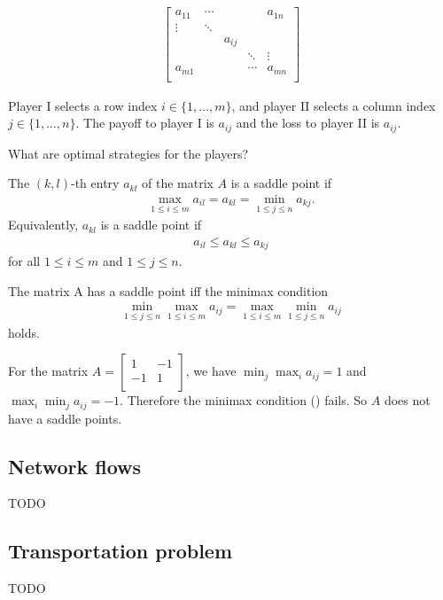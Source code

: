 \begin{align}
    \begin{bmatrix}
        a_{11} & \cdots &        &        & a_{1n} \\
        \vdots & \ddots &        &        & \\
               &        & a_{ij} &        & \\
               &        &        & \ddots & \vdots \\
        a_{m1} &        &        & \cdots & a_{mn} \\
    \end{bmatrix}
\end{align}

Player I selects a row index $i \in \{ 1, \dots, m \}$, and player II selects a column index $j \in \{ 1, \dots, n \}$.
The payoff to player I is $a_{ij}$ and the loss to player II is $a_{ij}$.

What are optimal strategies for the players?

\begin{definition}
The $(k,l)$-th entry $a_{kl}$ of the matrix $A$ is a saddle point if 
\begin{align}
    \max _{1 \le i \le m} a_{il} = a_{kl} = \min _{1 \le j \le n} a_{kj}.
\end{align}
Equivalently, $a_{kl}$ is a saddle point if 
\begin{align}
    a_{il} \le a_{kl} \le a_{kj}
\end{align}
for all $1 \le i \le m$ and $1 \le j \le n$.
\end{definition}

\begin{theorem}
    The matrix A has a saddle point iff the minimax condition
    \begin{align}
        \min _{1 \le j \le n} \max _{1 \le i \le m} a_{ij} = \max _{1 \le i \le m} \min _{1 \le j \le n} a_{ij}
    \end{align}
    holds.
\end{theorem}

\begin{example}
    For the matrix $A = \begin{bmatrix} 1 & -1 \\ -1 & 1 \\ \end{bmatrix}$, we have $\min _{j} \max _{i} a_{ij} = 1$ and $\max _{i} \min _{j} a_{ij} = -1$.
    Therefore the minimax condition () fails.
    So $A$ does not have a saddle points.
\end{example}

\subsection{Network flows}

TODO

\subsection{Transportation problem}

TODO